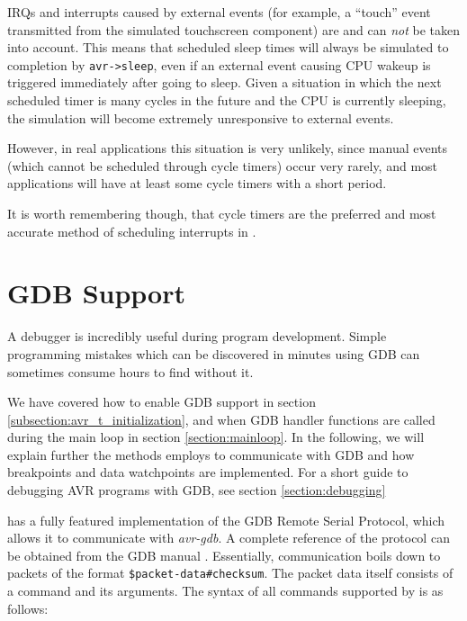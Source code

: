 \acp{IRQ} and interrupts caused by external events (for example, a ``touch'' event transmitted
from the simulated touchscreen component) are and can \emph{not} be taken into
account.
This means that scheduled sleep times will always be simulated to completion by
\lstinline|avr->sleep|, even if an external event causing \ac{CPU} wakeup is
triggered immediately after going to sleep.
Given a situation in which the next scheduled timer is many cycles in the future
and the \ac{CPU} is currently sleeping, the simulation will become extremely
unresponsive to external events.

However, in real applications this situation is very unlikely, since
manual events (which cannot be scheduled through cycle timers) occur very rarely,
and most applications will have at least some cycle timers with a short period.

It is worth remembering though, that cycle timers are the preferred and most
accurate method of scheduling interrupts in \simavr.


\section{\acf{GDB} Support} \label{section:gdb_support}

A debugger is incredibly useful during program development. Simple programming mistakes
which can be discovered in minutes using \ac{GDB} can sometimes consume hours
to find without it.

We have covered how to enable \ac{GDB} support in section
\ref{subsection:avr_t_initialization}, and when \ac{GDB} handler functions are
called during the main loop in section \ref{section:mainloop}. In the following,
we will explain further the methods \simavr employs to communicate with
\ac{GDB} and how breakpoints and data watchpoints are implemented. For
a short guide to debugging \ac{AVR} programs with \ac{GDB}, see section
\ref{section:debugging}

\simavr has a fully featured implementation of the \ac{GDB} Remote Serial Protocol,
which allows it to communicate with \emph{avr-gdb}. A complete reference of
the protocol can be obtained from the \ac{GDB} manual \cite{gdb}. Essentially,
communication boils down to packets of the format \lstinline|$packet-data#checksum|.
The packet data itself consists of a command and its arguments. The syntax of
all commands supported by \simavr is as follows:

